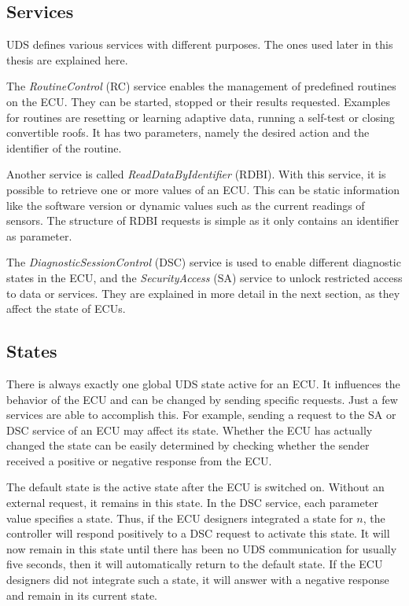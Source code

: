 \subsection{Services}
\label{subsubsec:uds-services}

UDS defines various services with different purposes. The ones used later in this thesis are explained here.

The \emph{RoutineControl} (RC) service enables the management of predefined routines on the ECU. They can be started, stopped or their results requested. Examples for routines are resetting or learning adaptive data, running a self-test or closing convertible roofs. It has two parameters, namely the desired action and the identifier of the routine.

Another service is called \emph{ReadDataByIdentifier} (RDBI). With this service, it is possible to retrieve one or more values of an ECU. This can be static information like the software version or dynamic values such as the current readings of sensors. The structure of RDBI requests is simple as it only contains an identifier as parameter.

The \emph{DiagnosticSessionControl} (DSC) service is used to enable different diagnostic states in the ECU, and the \emph{SecurityAccess} (SA) service to unlock restricted access to data or services. They are explained in more detail in the next section, as they affect the state of ECUs.

\subsection{States}
\label{subsec:states}

There is always exactly one global UDS state active for an ECU. It influences the behavior of the ECU and can be changed by sending specific requests. Just a few services are able to accomplish this. For example, sending a request to the SA or DSC service of an ECU may affect its state. Whether the ECU has actually changed the state can be easily determined by checking whether the sender received a positive or negative response from the ECU.

The default state is the active state after the ECU is switched on. Without an external request, it remains in this state. In the DSC service, each parameter value specifies a state. Thus, if the ECU designers integrated a state for $n$, the controller will respond positively to a DSC request to activate this state. It will now remain in this state until there has been no UDS communication for usually five seconds, then it will automatically return to the default state. If the ECU designers did not integrate such a state, it will answer with a negative response and remain in its current state.

